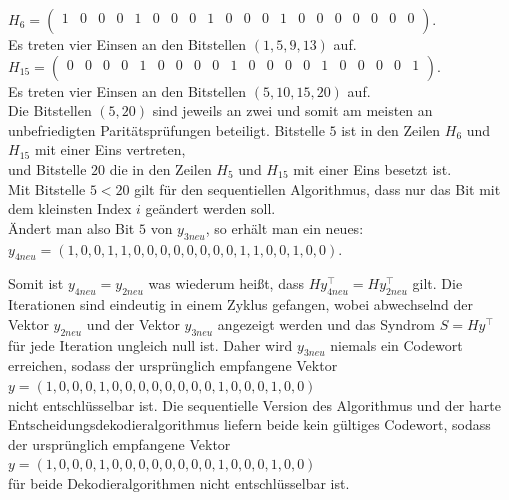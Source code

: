 \begin{Beispiel}
    $H_6=\left( \begin{array}{rrrrrrrrrrrrrrrrrrrr}
        1 & 0 & 0 & 0 & 1 & 0 & 0 & 0 & 1 & 0 & 0 & 0 & 1 & 0 & 0 & 0 & 0 & 0 & 0 & 0 \\
       \end{array}\right). 
    $\\
    Es treten vier Einsen an den Bitstellen $(1, 5, 9, 13)$ auf.\\
    
    
    $H_{15}=\left( \begin{array}{rrrrrrrrrrrrrrrrrrrr}
        0 & 0 & 0 & 0 & 1 & 0 & 0 & 0 & 0 & 1 & 0 & 0 & 0 & 0 & 1 & 0 & 0 & 0 & 0 & 1 \\
       \end{array}\right). 
    $\\
    Es treten vier Einsen an den Bitstellen $(5, 10, 15, 20)$ auf.\\
    
    Die Bitstellen $(5, 20)$ sind jeweils an zwei und somit am meisten an unbefriedigten Paritätsprüfungen beteiligt.  
    Bitstelle $5$ ist in den Zeilen $H_6$ und $H_{15}$  mit einer Eins vertreten,\\
    und Bitstelle $20$ die in den Zeilen $H_5$ und $H_{15}$ mit einer Eins besetzt ist.\\
    Mit Bitstelle $5 < 20$ gilt für den sequentiellen Algorithmus, dass nur das Bit mit dem kleinsten Index $i$ geändert werden soll.\\
    
    Ändert man also Bit $5$ von $y_{3neu}$, so erhält man ein neues:\\
    $y_{4neu}= (1,0,0,1,1,0,0,0,0,0,0,0,0,1,1,0,0,1,0,0).$\\
    \pagebreak
    
    Somit ist $y_{4neu} = y_{2neu}$ was wiederum hei\ss{}t, dass $Hy_{4neu}^\intercal = Hy_{2neu}^\intercal$ gilt.
    Die Iterationen sind eindeutig in einem Zyklus gefangen, wobei abwechselnd 
    der Vektor $y_{2neu}$ und der Vektor $y_{3neu}$ angezeigt werden und  
    das Syndrom $S = Hy^\intercal$ für jede Iteration ungleich null ist. 
    Daher wird $y_{3neu}$ niemals ein Codewort erreichen, 
    sodass der ursprünglich empfangene Vektor\\
    $y = (1,0,0,0,1,0,0,0,0,0,0,0,0,1,0,0,0,1,0,0)$\\
    nicht entschlüsselbar ist. Die sequentielle Version des Algorithmus und 
    der harte Entscheidungsdekodieralgorithmus liefern beide kein gültiges Codewort, 
    sodass der ursprünglich empfangene Vektor\\
    $y = (1,0,0,0,1,0,0,0,0,0,0,0,0,1,0,0,0,1,0,0)$\\
    für beide Dekodieralgorithmen nicht entschlüsselbar ist. 
    

\end{Beispiel}
